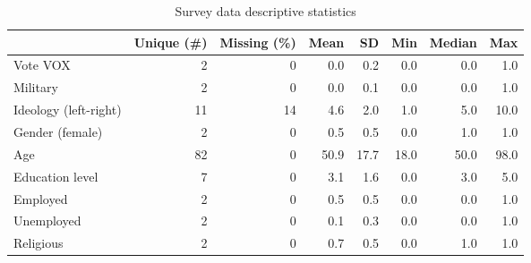 \begin{table}[!h]

\caption{Survey data descriptive statistics\label{tab:survey\_desc}}
\centering
\begin{tabular}[t]{lrrrrrrr}
\toprule
  & Unique (\#) & Missing (\%) & Mean & SD & Min & Median & Max\\
\midrule
Vote VOX & 2 & 0 & 0.0 & 0.2 & 0.0 & 0.0 & 1.0\\
Military & 2 & 0 & 0.0 & 0.1 & 0.0 & 0.0 & 1.0\\
Ideology (left-right) & 11 & 14 & 4.6 & 2.0 & 1.0 & 5.0 & 10.0\\
Gender (female) & 2 & 0 & 0.5 & 0.5 & 0.0 & 1.0 & 1.0\\
Age & 82 & 0 & 50.9 & 17.7 & 18.0 & 50.0 & 98.0\\
Education level & 7 & 0 & 3.1 & 1.6 & 0.0 & 3.0 & 5.0\\
Employed & 2 & 0 & 0.5 & 0.5 & 0.0 & 0.0 & 1.0\\
Unemployed & 2 & 0 & 0.1 & 0.3 & 0.0 & 0.0 & 1.0\\
Religious & 2 & 0 & 0.7 & 0.5 & 0.0 & 1.0 & 1.0\\
\bottomrule
\end{tabular}
\end{table}
